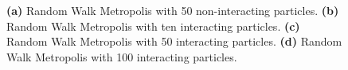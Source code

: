 \begin{figure}[!htb]
\qquad
{}
\caption{\textbf{(a)} Random Walk Metropolis with 50 non-interacting particles. \textbf{(b)} Random Walk Metropolis with ten interacting particles. \textbf{(c)} Random Walk Metropolis with 50 interacting particles. \textbf{(d)} Random Walk Metropolis with 100 interacting particles.}
\label{fig:interactions_plot}
\end{figure}


